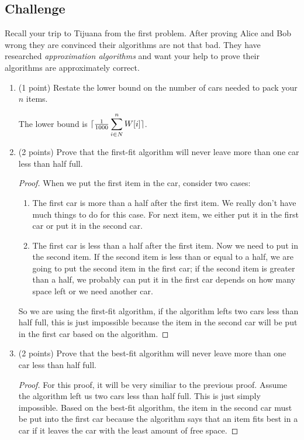 \documentclass[paper=a4, fontsize=11pt]{scrartcl}
\DeclarePairedDelimiter\ceil{\lceil}{\rceil}
\numberwithin{equation}{section}		%
\numberwithin{figure}{section}			%
\numberwithin{table}{section}				%
\begin{document}
\subsection{Challenge}
Recall your trip to Tijuana from the first problem.  After proving Alice and Bob wrong they are convinced their algorithms are not that bad.  They have researched \textit{approximation algorithms} and want your help to prove their algorithms are approximately correct.

\begin{enumerate}
\item (1 point) Restate the lower bound on the number of cars needed to pack your $n$ items.

The lower bound is $\ceil{\frac{1}{1000} \displaystyle\sum_{i\in N}^n W[i]}$.

\item (2 points) Prove that the first-fit algorithm will never leave more than one car less than half full.
\begin{proof}
	When we put the first item in the car, consider two cases:
	\begin{enumerate}
		\item The first car is more than a half after the first item. We really don't have much things to do for this case. For next item, we either put it in the first car or put it in the second car.
		
		\item The first car is less than a half after the first item. Now we need to put in the second item. If the second item is less than or equal to a half, we are going to put the second item in the first car; if the second item is greater than a half, we probably can put it in the first car depends on how many space left or we need another car.
	\end{enumerate}

So we are using the first-fit algorithm, if the algorithm lefts two cars less than half full, this is just impossible because the item in the second car will be put in the first car based on the algorithm. 
\end{proof}

\item (2 points) Prove that the best-fit algorithm will never leave more than one car less than half full.
\begin{proof}
	For this proof, it will be very similiar to the previous proof. Assume the algorithm left us two cars less than half full. This is just simply impossible. Based on the best-fit algorithm, the item in the second car must be put into the first car because the algorithm says that an item fits best in a car if it leaves the car with the least amount of free space.
\end{proof}


\end{enumerate}
\end{document}
